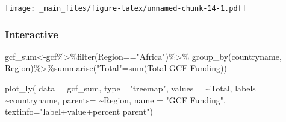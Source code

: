 \documentclass[
]{book}
\newenvironment{Shaded}{\begin{snugshade}}{\end{snugshade}}
\newcommand{\AttributeTok}[1]{\textcolor[rgb]{0.77,0.63,0.00}{#1}}
\newcommand{\FunctionTok}[1]{\textcolor[rgb]{0.00,0.00,0.00}{#1}}
\newcommand{\NormalTok}[1]{#1}
\newcommand{\OtherTok}[1]{\textcolor[rgb]{0.56,0.35,0.01}{#1}}
\newcommand{\SpecialCharTok}[1]{\textcolor[rgb]{0.00,0.00,0.00}{#1}}
\newcommand{\StringTok}[1]{\textcolor[rgb]{0.31,0.60,0.02}{#1}}
\begin{document}
\begin{Shaded}
\end{Shaded}

\texttt{[image: \_main\_files/figure-latex/unnamed-chunk-14-1.pdf]}

\hypertarget{interactive}{%
\subsubsection{Interactive}\label{interactive}}

\begin{Shaded}
\begin{Highlighting}[]
\NormalTok{gcf\_sum}\OtherTok{\textless{}{-}}\NormalTok{gcf}\SpecialCharTok{\%\textgreater{}\%}\FunctionTok{filter}\NormalTok{(Region}\SpecialCharTok{==}\StringTok{"Africa"}\NormalTok{)}\SpecialCharTok{\%\textgreater{}\%}
  \FunctionTok{group\_by}\NormalTok{(countryname, Region)}\SpecialCharTok{\%\textgreater{}\%}\FunctionTok{summarise}\NormalTok{(}\StringTok{"Total"}\OtherTok{=}\FunctionTok{sum}\NormalTok{(}\StringTok{\textasciigrave{}}\AttributeTok{Total GCF Funding}\StringTok{\textasciigrave{}}\NormalTok{))}

\FunctionTok{plot\_ly}\NormalTok{(}
  \AttributeTok{data =}\NormalTok{ gcf\_sum,}
  \AttributeTok{type=} \StringTok{"treemap"}\NormalTok{,}
  \AttributeTok{values =} \SpecialCharTok{\textasciitilde{}}\NormalTok{Total,}
  \AttributeTok{labels=} \SpecialCharTok{\textasciitilde{}}\NormalTok{countryname,}
  \AttributeTok{parents=} \SpecialCharTok{\textasciitilde{}}\NormalTok{Region,}
  \AttributeTok{name =} \StringTok{"GCF Funding"}\NormalTok{,}
  \AttributeTok{textinfo=}\StringTok{"label+value+percent parent"}\NormalTok{)}
\end{Highlighting}
\end{Shaded}
\end{document}
